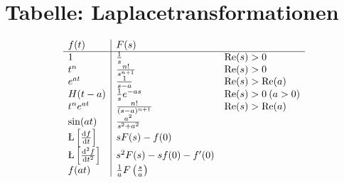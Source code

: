 \chapter{Tabelle: Laplacetransformationen}
\[ \begin{array}{ l | l l }
	f(t) & F(s) & \\ \hline
	1 & \frac{1}{s} & \Re(s) > 0 \\
	t^n & \frac{n!}{s^{n+1}} & \Re(s) > 0 \\
	e^{at} & \frac{1}{s-a} & \Re(s) > \Re(a) \\
	H(t-a) & \frac{1}{s} e^{-as} & \Re(s) > 0 \: (a > 0) \\
	t^n e^{at} & \frac{n!}{(s-a)^{n+1}} & \Re(s) > \Re(a) \\
	\sin(at) & \frac{a^2}{s^2 + a^2} & \\
	\L\left[ \frac{\dd f}{\dd t} \right] & s F(s) - f(0) & \\
	\L\left[ \frac{\dd^2 f}{\dd t^2} \right] & s^2 F(s) - s f(0) - f'(0) & \\
	f(at) & \frac{1}{a} F\left( \frac{s}{a} \right) &
\end{array} \]
